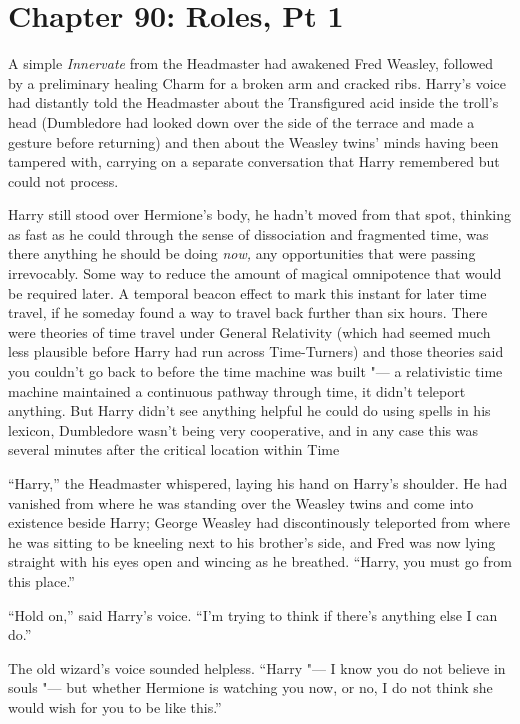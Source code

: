 \chapter{Chapter 90: Roles, Pt 1}
A simple \emph{Innervate} from the Headmaster had awakened Fred Weasley,
followed by a preliminary healing Charm for a broken arm and cracked
ribs. Harry's voice had distantly told the Headmaster about the
Transfigured acid inside the troll's head (Dumbledore had looked down
over the side of the terrace and made a gesture before returning) and
then about the Weasley twins' minds having been tampered with, carrying
on a separate conversation that Harry remembered but could not process.

Harry still stood over Hermione's body, he hadn't moved from that spot,
thinking as fast as he could through the sense of dissociation and
fragmented time, was there anything he should be doing \emph{now,} any
opportunities that were passing irrevocably. Some way to reduce the
amount of magical omnipotence that would be required later. A temporal
beacon effect to mark this instant for later time travel, if he someday
found a way to travel back further than six hours. There were theories
of time travel under General Relativity (which had seemed much less
plausible before Harry had run across Time-Turners) and those theories
said you couldn't go back to before the time machine was built "--- a
relativistic time machine maintained a continuous pathway through time,
it didn't teleport anything. But Harry didn't see anything helpful he
could do using spells in his lexicon, Dumbledore wasn't being very
cooperative, and in any case this was several minutes after the critical
location within Time

``Harry,'' the Headmaster whispered, laying his hand on Harry's
shoulder. He had vanished from where he was standing over the Weasley
twins and come into existence beside Harry; George Weasley had
discontinously teleported from where he was sitting to be kneeling next
to his brother's side, and Fred was now lying straight with his eyes
open and wincing as he breathed. ``Harry, you must go from this place.''

``Hold on,'' said Harry's voice. ``I'm trying to think if there's
anything else I can do.''

The old wizard's voice sounded helpless. ``Harry "--- I know you do not
believe in souls "--- but whether Hermione is watching you now, or no, I do
not think she would wish for you to be like this.''

